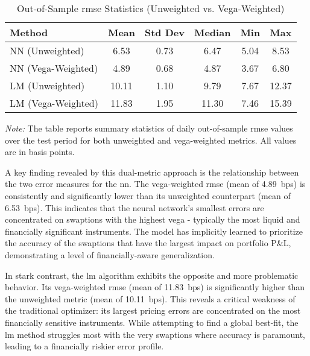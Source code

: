 \begin{table}[htbp]
	\centering
	\begin{threeparttable}
		\caption{Out-of-Sample \ac{rmse} Statistics (Unweighted vs. Vega-Weighted)}
		\label{tab:rmse_statistics}
		\begin{tabular}{lccccc}
			\toprule
			\textbf{Method} & \textbf{Mean} & \textbf{Std Dev} & \textbf{Median} & \textbf{Min} & \textbf{Max} \\
			\midrule
			NN (Unweighted)     & 6.53          & 0.73             & 6.47            & 5.04         & 8.53         \\
			NN (Vega-Weighted)  & 4.89          & 0.68             & 4.87            & 3.67         & 6.80         \\
			\midrule
			LM (Unweighted)     & 10.11         & 1.10             & 9.79            & 7.67         & 12.37        \\
			LM (Vega-Weighted)  & 11.83         & 1.95             & 11.30           & 7.46         & 15.39        \\
			\bottomrule
		\end{tabular}
		\begin{tablenotes}
			\footnotesize
			\item \textit{Note:} The table reports summary statistics of daily out-of-sample \ac{rmse} values over the test period for both unweighted and vega-weighted metrics. All values are in basis points.
		\end{tablenotes}
	\end{threeparttable}
\end{table}

A key finding revealed by this dual-metric approach is the relationship between the two error measures for the \ac{nn}. The vega-weighted \ac{rmse} (mean of 4.89~\ac{bps}) is consistently and significantly lower than its unweighted counterpart (mean of 6.53~\ac{bps}). This indicates that the neural network's smallest errors are concentrated on swaptions with the highest vega - typically the most liquid and financially significant instruments. The model has implicitly learned to prioritize the accuracy of the swaptions that have the largest impact on portfolio P\&L, demonstrating a level of financially-aware generalization.

In stark contrast, the \ac{lm} algorithm exhibits the opposite and more problematic behavior. Its vega-weighted \ac{rmse} (mean of 11.83~\ac{bps}) is significantly higher than the unweighted metric (mean of 10.11~\ac{bps}). This reveals a critical weakness of the traditional optimizer: its largest pricing errors are concentrated on the most financially sensitive instruments. While attempting to find a global best-fit, the \ac{lm} method struggles most with the very swaptions where accuracy is paramount, leading to a financially riskier error profile.

